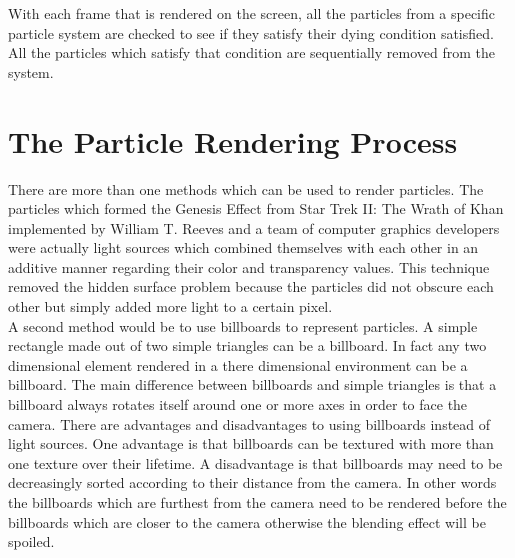 With each frame that is rendered on the screen, all the particles from a specific particle system are checked to see if they satisfy their dying condition satisfied. All the particles which satisfy that condition are sequentially removed from the system.

\section{The Particle Rendering Process}
There are more than one methods which can be used to render particles. The particles which formed the Genesis Effect from Star Trek II: The Wrath of Khan implemented by William T. Reeves and a team of computer graphics developers were actually light sources which combined themselves with each other in an additive manner regarding their color and transparency values. This technique removed the hidden surface problem because the particles did not obscure each other but simply added more light to a certain pixel.\\

A second method would be to use billboards to represent particles. A simple rectangle made out of two simple triangles can be a billboard. In fact any two dimensional element rendered in a there dimensional environment can be a billboard. The main difference between billboards and simple triangles is that a billboard always rotates itself around one or more axes in order to face the camera. There are advantages and disadvantages to using billboards instead of light sources. One advantage is that billboards can be textured with more than one texture over their lifetime. A disadvantage is that billboards may need to be decreasingly sorted according to their distance from the camera. In other words the billboards which are furthest from the camera need to be rendered before the billboards which are closer to the camera otherwise the blending effect will be spoiled.\\

